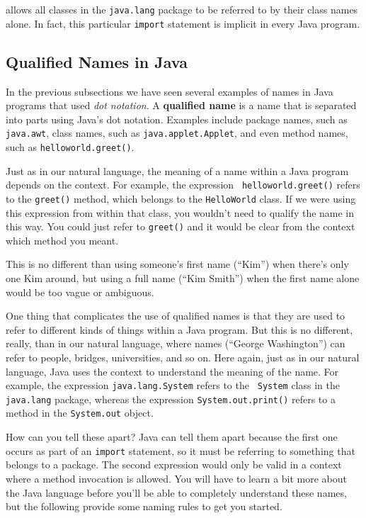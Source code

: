\noindent allows all classes in the {\tt java.lang} package to
be referred to by their class names alone. In fact, this particular
{\tt import} statement is implicit in every Java program.

\subsection{Qualified Names in Java}
\label{sec-qualifiednames}
\label{pg-sec-qualifiednames}

\noindent In the previous subsections we have seen several
examples of names in Java programs that used {\it dot notation}.  A
{\bf qualified name} is a name that is separated into parts using
Java's dot notation. Examples include package names, such as {\tt
java.awt}, class names, such as {\tt java.applet.Applet}, and
even method names, such as {\tt helloworld.greet()}.

Just as in our natural language, the meaning of a name within a Java
program depends on the context.  For example, the expression {\tt
helloworld.greet()} refers to the {\tt greet()} method, which
belongs to the {\tt HelloWorld} class.  If we were using this
expression from within that class, you wouldn't need to qualify
the name in this way.  You could just refer to {\tt greet()} and it
would be clear from the context which method you meant.

This is no different than using someone's first name (``Kim'') when
there's only one Kim around, but using a full name (``Kim Smith'')
when the first name alone would be too vague or ambiguous.

One thing that complicates the use of qualified names is that they are
used to refer to different kinds of things within a Java program.  But
this is no different, really, than in our natural language, where
names (``George Washington'') can refer to people, bridges,
universities, and so on. Here again, just as in our natural language,
Java uses the context to understand the meaning of the name.  For
example, the expression {\tt java.lang.System} refers to the {\tt
System} class in the {\tt java.lang} package, whereas the expression
{\tt System.out.print()} refers to a method in the {\tt System.out}
object.

How can you tell these apart?  Java can tell them apart because the
first one occurs as part of an {\tt import} statement, so it must be
referring to something that belongs to a package.  The second expression
would only be valid in a context where a method invocation is allowed.
You will have to learn a bit more about the Java language before
you'll be able to completely understand these names, but the following
provide some naming rules to get you started.

